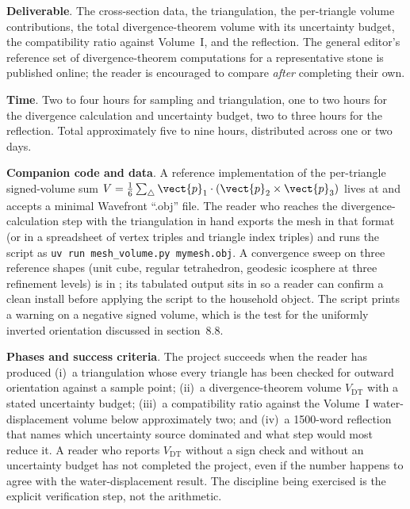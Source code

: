 \begin{project}
\textbf{Deliverable}. The cross-section data, the triangulation, the
per-triangle volume contributions, the total divergence-theorem
volume with its uncertainty budget, the compatibility ratio against
Volume~I, and the reflection. The general editor's reference set of
divergence-theorem computations for a representative stone is
published online; the reader is encouraged to compare \emph{after}
completing their own.

\textbf{Time}. Two to four hours for sampling and triangulation, one
to two hours for the divergence calculation and uncertainty budget,
two to three hours for the reflection. Total approximately five to
nine hours, distributed across one or two days.

\textbf{Companion code and data}. A reference implementation of the
per-triangle signed-volume sum
$V = \tfrac{1}{6}\sum_{\triangle}\vect{p}_{1}\cdot(\vect{p}_{2}\times
\vect{p}_{3})$ lives at
and accepts a minimal Wavefront ``.obj'' file. The reader who reaches
the divergence-calculation step with the triangulation in hand
exports the mesh in that format (or in a spreadsheet of vertex
triples and triangle index triples) and runs the script as
\texttt{uv run mesh\_volume.py mymesh.obj}. A convergence sweep on
three reference shapes (unit cube, regular tetrahedron, geodesic
icosphere at three refinement levels) is in
; its tabulated output sits
in  so a reader can confirm a
clean install before applying the script to the household object.
The script prints a warning on a negative signed volume, which is
the test for the uniformly inverted orientation discussed in
section~8.8.

\textbf{Phases and success criteria}. The project succeeds when the
reader has produced (i)~a triangulation whose every triangle has been
checked for outward orientation against a sample point; (ii)~a
divergence-theorem volume $V_{\text{DT}}$ with a stated uncertainty
budget; (iii)~a compatibility ratio against the Volume~I
water-displacement volume below approximately two; and (iv)~a
1500-word reflection that names which uncertainty source dominated
and what step would most reduce it. A reader who reports
$V_{\text{DT}}$ without a sign check and without an uncertainty
budget has not completed the project, even if the number happens to
agree with the water-displacement result. The discipline being
exercised is the explicit verification step, not the arithmetic.


\end{project}
